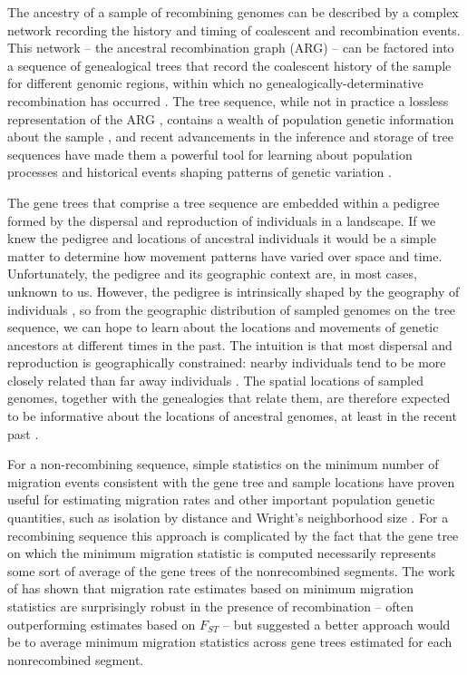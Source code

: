The ancestry of a sample of recombining genomes can be described by a complex
network recording the history and timing of coalescent and recombination
events. This network -- the ancestral recombination graph (ARG) -- can be
factored into a sequence of genealogical trees that record the coalescent 
history of the sample for different genomic regions, within which no 
genealogically-determinative recombination has occurred 
. 
The tree sequence, 
while not in practice a lossless representation of the ARG , contains a wealth 
of population genetic information about the sample \citep{Ralph_etal_2020}, and
recent advancements in the inference and storage of tree sequences have made 
them a powerful tool for learning about population processes and historical 
events shaping patterns of genetic variation
\citep{Anderson-Trocme_etal_2023, Kelleher_etal_2016, Kelleher_etal_2019}.

The gene trees that comprise a tree sequence are embedded within a pedigree
formed by the dispersal and reproduction of individuals in a landscape. If we 
knew the pedigree and locations of ancestral individuals it would be a simple 
matter to determine how movement patterns have varied over space and time. 
Unfortunately, the pedigree and its geographic context are, in most cases, 
unknown to us. However, the pedigree is intrinsically shaped by the geography 
of individuals \citep{Bradburd_Ralph_2019},
so from the geographic distribution of sampled genomes on the tree
sequence, we can hope to learn about the locations and movements of 
genetic ancestors at different times in the past. The intuition is that most
dispersal and reproduction is geographically constrained: nearby individuals 
tend to be more closely related than far away individuals \citep{Wright_1943}.  
The spatial locations of sampled genomes, together with the genealogies that 
relate them, are therefore expected to be informative about the locations of 
ancestral genomes, at least in the recent past \citep{Wakeley_1999, Wilkins_2004}.

For a non-recombining sequence, simple statistics on the minimum number of
migration events consistent with the gene tree and sample locations have
proven useful for estimating migration rates and other important population
genetic quantities, such as isolation by distance and Wright's neighborhood
size \citep{Slatkin_Maddison_1989, Slatkin_Maddison_1990}. For a recombining
sequence this approach is complicated by the fact that the gene tree on which
the minimum migration statistic is computed necessarily represents some sort of
average of the gene trees of the nonrecombined segments. The work of 
\citet{Hudson_etal_1992} has shown that migration rate estimates based on
minimum migration statistics are surprisingly robust in the presence of
recombination -- often outperforming estimates based on $F_{ST}$ -- but 
suggested a better approach would be to average minimum migration 
statistics across gene trees estimated for each nonrecombined segment.

